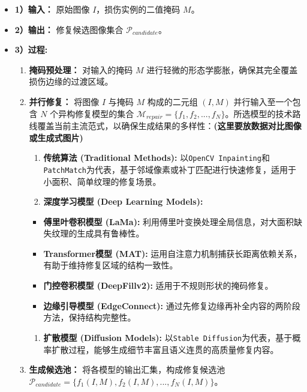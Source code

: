 \documentclass[
]{article}
\begin{document}
\begin{itemize}
\item
  \textbf{1）输入：} 原始图像 \(I\)，损伤实例的二值掩码 \(M\)。
\item
  \textbf{2）输出：} 修复候选图像集合 \(\mathcal{P}_{candidate}\)。
\item
  \textbf{3）过程:}

  \begin{enumerate}
  \def\labelenumi{\arabic{enumi}.}
  \item
    \textbf{掩码预处理：} 对输入的掩码 \(M\)
    进行轻微的形态学膨胀，确保其完全覆盖损伤边缘的过渡区域。
  \item
    \textbf{并行修复：} 将图像 \(I\) 与掩码 \(M\) 构成的二元组
    \((I, M)\) 并行输入至一个包含 \(N\) 个异构修复模型的集合
    \(\mathcal{M}_{repair} = \{f_1, f_2, ..., f_N\}\)。所选模型的技术路线覆盖当前主流范式，以确保生成结果的多样性：\textbf{(这里要放数据对比图像或生成式图片)}

    \begin{enumerate}
    \def\labelenumii{\arabic{enumii}.}
    \item
      \textbf{传统算法 (Traditional Methods):}
      以\texttt{OpenCV\ Inpainting}和\texttt{PatchMatch}为代表，基于邻域像素或补丁匹配进行快速修复，适用于小面积、简单纹理的修复场景。
    \item
      \textbf{深度学习模型 (Deep Learning Models):}
    \end{enumerate}

    \begin{itemize}
    \item
      \textbf{傅里叶卷积模型 (LaMa):}
      利用傅里叶变换处理全局信息，对大面积缺失纹理的生成具有鲁棒性。
    \item
      \textbf{Transformer模型 (MAT):}
      运用自注意力机制捕获长距离依赖关系，有助于维持修复区域的结构一致性。
    \item
      \textbf{门控卷积模型 (DeepFillv2):} 适用于不规则形状的掩码修复。
    \item
      \textbf{边缘引导模型 (EdgeConnect):}
      通过先修复边缘再补全内容的两阶段方法，保持结构完整性。
    \end{itemize}

    \begin{enumerate}
    \def\labelenumii{\arabic{enumii}.}
    \item
      \textbf{扩散模型 (Diffusion Models):}
      以\texttt{Stable\ Diffusion}为代表，基于概率扩散过程，能够生成细节丰富且语义连贯的高质量修复内容。
    \end{enumerate}
  \item
    \textbf{生成候选池：} 将各模型的输出汇集，构成修复候选池
    \(\mathcal{P}_{candidate} = \{f_1(I, M), f_2(I, M), ..., f_N(I, M)\}\)。
  \end{enumerate}
\end{itemize}
\end{document}
